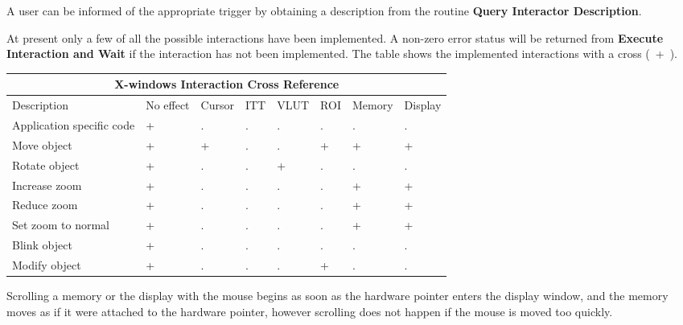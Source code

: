 A user can be informed of the appropriate trigger by obtaining a description
from the routine {\bf Query Interactor Description}.

At present only a few of all the possible interactions have been implemented.
A non-zero error status will be returned from {\bf Execute Interaction and
Wait} if the interaction has not been implemented.
The table shows the implemented interactions with a cross (~+~).

\begin{small}
\begin{center}
\begin{tabular}{|p{11em}||p{3.0em}||p{3.5em}||p{2.5em}|
                |p{3.5em}||p{3.5em}||p{3.7em}||p{3.5em}|}
\hline
\multicolumn{8}{|c|}{X-windows Interaction Cross Reference} \\ \hline \hline
Description & No effect & Cursor & ITT & VLUT & ROI & Memory & Display \\
\hline
Application specific code & + & . & . & . & . & . & . \\
Move object               & + & + & . & . & + & + & + \\
Rotate object             & + & . & . & + & . & . & . \\
Increase zoom             & + & . & . & . & . & + & + \\
Reduce zoom               & + & . & . & . & . & + & + \\
Set zoom to normal        & + & . & . & . & . & + & + \\
Blink object              & + & . & . & . & . & . & . \\
Modify object             & + & . & . & . & + & . & . \\
\hline
\end{tabular}
\end{center}
\end{small}

Scrolling a memory or the display with the mouse begins as soon as the
hardware pointer enters the display window, and the memory moves as
if it were attached to the hardware pointer, however scrolling does
not happen if the mouse is moved too quickly. 

